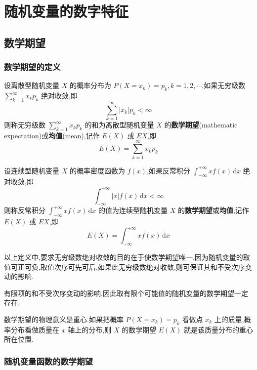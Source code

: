 
\chapter{随机变量的数字特征}
\thispagestyle{plain}

\section{数学期望}

\subsection{数学期望的定义}

\begin{definition}
    \indent 设离散型随机变量 $X$ 的概率分布为 $P(X=x_k) = p_k, k=1,2,\cdots$,如果无穷级数 $\displaystyle\sum_{k=1}^{\infty} x_k p_k$ 绝对收敛,即
    $$
    \sum_{k=1}^{\infty} |x_k| p_k < \infty
    $$
    则称无穷级数 $\displaystyle\sum_{k=1}^{\infty} x_k p_k$ 的和为离散型随机变量 $X$ 的\textbf{数学期望}(mathematic expectation)或\textbf{均值}(mean),记作 $E(X)$ 或 $EX$,即
    $$
    E(X) = \sum_{k=1}^{\infty} x_k p_k
    $$

    设连续型随机变量 $X$ 的概率密度函数为 $f(x)$,如果反常积分 $\displaystyle\int_{-\infty}^{+\infty} x f(x) \, \text{d}x$ 绝对收敛,即
    $$
    \int_{-\infty}^{+\infty} |x| f(x) \, \text{d}x < \infty
    $$
    则称反常积分 $\displaystyle\int_{-\infty}^{+\infty} x f(x) \, \text{d}x$ 的值为连续型随机变量 $X$ 的\textbf{数学期望}或\textbf{均值},记作 $E(X)$ 或 $EX$,即
    $$
    E(X) = \int_{-\infty}^{+\infty} x f(x) \, \text{d}x
    $$
\end{definition}

\begin{note}
    \indent 以上定义中,要求无穷级数绝对收敛的目的在于使数学期望唯一.因为随机变量的取值可正可负,取值次序可先可后,如果此无穷级数绝对收敛,则可保证其和不受次序变动的影响.

    有限项的和不受次序变动的影响,因此取有限个可能值的随机变量的数学期望一定存在.
\end{note}

数学期望的物理意义是重心.如果把概率 $P(X=x_k) = p_k$ 看做点 $x_k$ 上的质量,概率分布看做质量在 $x$ 轴上的分布,则 $X$ 的数学期望 $E(X)$ 就是该质量分布的重心所在位置.

\subsection{随机变量函数的数学期望}

